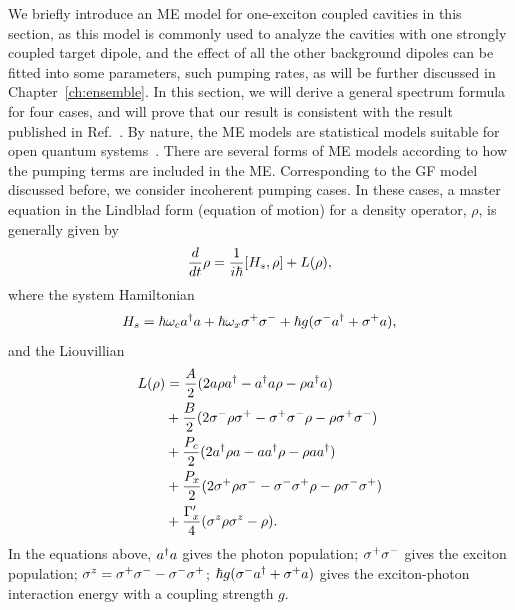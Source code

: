 We briefly introduce an ME model for one-exciton coupled cavities in this section, as this model is commonly used to analyze the cavities with one strongly coupled target dipole, and the effect of all the other background dipoles can be fitted into some parameters, such pumping rates, as will be further discussed in Chapter~\ref{ch:ensemble}. In this section, we will derive a general spectrum formula for four cases, and will prove that our result is consistent with the result published in Ref.~\cite{yao2010nonlinear}. By nature, the ME models are statistical models suitable for open quantum systems~\cite{Carmichael2007}. There are several forms of ME models according to how the pumping terms are included in the ME. Corresponding to the GF model discussed before, we consider incoherent pumping cases. In these cases, a master equation in the Lindblad form (equation of motion) for a density operator, $\rho$, is generally given by
\begin{equation}
  \frac{d}{dt} \rho  = \frac{1}{i\hbar}[H_s,\rho] + L(\rho),
\end{equation}
where the system Hamiltonian
\begin{equation}
 H_s=\hbar\omega_c a^{\dagger} a+ \hbar \omega_x \sigma^{+}\sigma^{-} +\hbar g(\sigma^{-} a^{\dagger}+\sigma^{+} a),
\end{equation}
and the Liouvillian
\begin{align}
L(\rho) &= \frac{A}{2}(2a\rho a^{\dagger} - a^{\dagger} a\rho - \rho a^{\dagger} a) \label{Liouvillian1}\\
& +\frac{B}{2}(2\sigma^{-}\rho\sigma^{+} - \sigma^{+}\sigma^{-}\rho - \rho\sigma^{+}\sigma^{-} ) \label{Liouvillian2}\\
& +\frac{P_c}{2}(2a^{\dagger}\rho a - a a^{\dagger}\rho - \rho aa^{\dagger}) \label{Liouvillian3}\\
&+ \frac{P_x}{2} (2\sigma^{+}\rho\sigma^{-} - \sigma^{-}\sigma^{+}\rho - \rho\sigma^{-}\sigma^{+} )\label{Liouvillian4}\\
&+\frac{\Gamma_x^{\prime}}{4} (\sigma^{z}\rho\sigma^{z}-\rho)\label{Liouvillian5}.
\end{align}
In the equations above, $a^{\dagger} a$ gives the photon population; $\sigma^{+}\sigma^{-}$ gives the exciton population; $\sigma^{z} = \sigma^{+}\sigma^{-} - \sigma^{-}\sigma^{+}$; $\hbar g(\sigma^{-} a^{\dagger}+\sigma^{+} a)$ gives the exciton-photon interaction energy with a coupling strength $g$.


